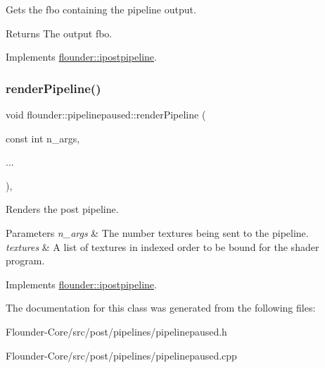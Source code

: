 Gets the fbo containing the pipeline output. 

\begin{DoxyReturn}{Returns}
The output fbo. 
\end{DoxyReturn}


Implements \hyperlink{classflounder_1_1ipostpipeline_a08f5d19b9652528337b73c2f4e0e4258}{flounder\+::ipostpipeline}.

\mbox{\label{classflounder_1_1pipelinepaused_ac3f87a0c31db13f6b25eaf02431c6644}} 
\subsubsection{\texorpdfstring{render\+Pipeline()}{renderPipeline()}}
{\footnotesize\ttfamily void flounder\+::pipelinepaused\+::render\+Pipeline (\begin{DoxyParamCaption}\item[{const int}]{n\+\_\+args,  }\item[{}]{... }\end{DoxyParamCaption})\hspace{0.3cm}{\ttfamily [override]}, {\ttfamily [virtual]}}



Renders the post pipeline. 


\begin{DoxyParams}{Parameters}
{\em n\+\_\+args} & The number textures being sent to the pipeline. \\
\hline
{\em textures} & A list of textures in indexed order to be bound for the shader program. \\
\hline
\end{DoxyParams}


Implements \hyperlink{classflounder_1_1ipostpipeline_a975b354967fa358076d02380feb55265}{flounder\+::ipostpipeline}.



The documentation for this class was generated from the following files\+:\begin{DoxyCompactItemize}
\item 
Flounder-\/\+Core/src/post/pipelines/pipelinepaused.\+h\item 
Flounder-\/\+Core/src/post/pipelines/pipelinepaused.\+cpp\end{DoxyCompactItemize}
